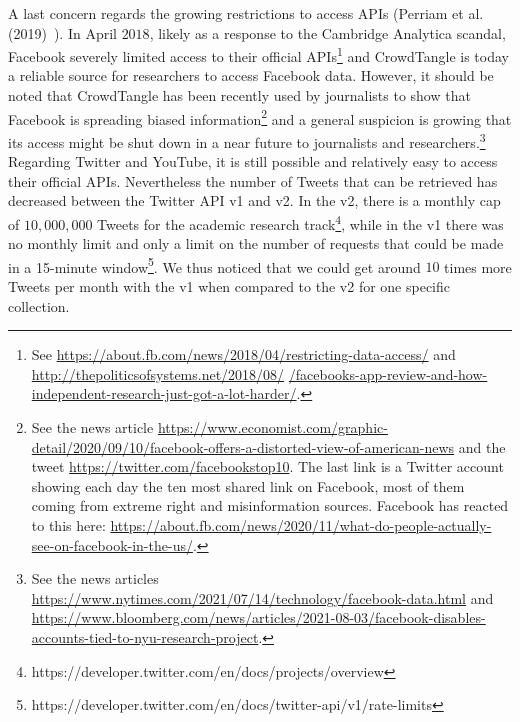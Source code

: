 \documentclass{article}
\begin{document}
A last concern regards the growing restrictions to access APIs (Perriam et al.(2019)~\cite{api}).
In April $2018$, likely as a response to the Cambridge Analytica scandal, Facebook severely limited access to their official APIs\footnote{See \href{https://about.fb.com/news/2018/04/restricting-data-access/}{https://about.fb.com/news/2018/04/restricting-data-access/} and \href{http://thepoliticsofsystems.net/2018/08/facebooks-app-review-and-how-independent-research-just-got-a-lot-harder/}{http://thepoliticsofsystems.net/2018/08/} \href{http://thepoliticsofsystems.net/2018/08/facebooks-app-review-and-how-independent-research-just-got-a-lot-harder/}{/facebooks-app-review-and-how-independent-research-just-got-a-lot-harder/}.} 
and CrowdTangle is today a reliable source for researchers to access Facebook data. 
However, it should be noted that CrowdTangle has been recently used by journalists to show that Facebook is spreading biased information\footnote{See the news article \href{https://www.economist.com/graphic-detail/2020/09/10/facebook-offers-a-distorted-view-of-american-news}{https://www.economist.com/graphic-detail/2020/09/10/facebook-offers-a-distorted-view-of-american-news} and the tweet \href{https://twitter.com/facebookstop10}{https://twitter.com/facebookstop10}. 
The last link is a Twitter account showing each day the ten most shared link on Facebook, most of them coming from extreme right and misinformation sources. 
Facebook has reacted to this here: \href{https://about.fb.com/news/2020/11/what-do-people-actually-see-on-facebook-in-the-us/}{https://about.fb.com/news/2020/11/what-do-people-actually-see-on-facebook-in-the-us/}.} 
and a general suspicion is growing that its access might be shut down in a near future to journalists and researchers.\footnote{See the news articles \href{https://www.nytimes.com/2021/07/14/technology/facebook-data.html}{https://www.nytimes.com/2021/07/14/technology/facebook-data.html} and \href{https://www.bloomberg.com/news/articles/2021-08-03/facebook-disables-accounts-tied-to-nyu-research-project}{https://www.bloomberg.com/news/articles/2021-08-03/facebook-disables-accounts-tied-to-nyu-research-project}.}
Regarding Twitter and YouTube, it is still possible and relatively easy to access their official APIs. Nevertheless the number of Tweets that can be retrieved has decreased between the Twitter API v1 and v2. 
In the v2, there is a monthly cap of $10,000,000$ Tweets for the academic research track\footnote{https://developer.twitter.com/en/docs/projects/overview},
while in the v1 there was no monthly limit and only a limit on the number of requests that could be made in a 15-minute window\footnote{https://developer.twitter.com/en/docs/twitter-api/v1/rate-limits}.
We thus noticed that we could get around $10$ times more Tweets per month with the v1 when compared to the v2 for one specific collection.
\end{document}
